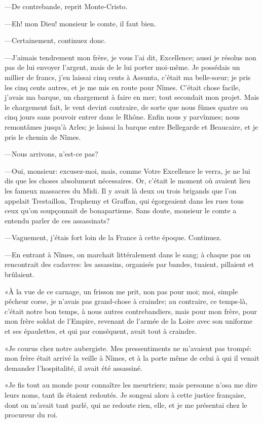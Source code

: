 —De contrebande, reprit Monte-Cristo. 

—Eh! mon Dieu! monsieur le comte, il faut bien. 

—Certainement, continuez donc.  

—J'aimais tendrement mon frère, je vous l'ai dit, Excellence; aussi je résolus non pas de lui envoyer l'argent, mais de le lui porter moi-même. Je possédais un millier de francs, j'en laissai cinq cents à Assunta, c'était ma belle-sœur; je pris les cinq cents autres, et je me mis en route pour Nîmes. C'était chose facile, j'avais ma barque, un chargement à faire en mer; tout secondait mon projet. Mais le chargement fait, le vent devint contraire, de sorte que nous fûmes quatre ou cinq jours sans pouvoir entrer dans le Rhône. Enfin nous y parvînmes; nous remontâmes jusqu'à Arles; je laissai la barque entre Bellegarde et Beaucaire, et je pris le chemin de Nîmes. 

—Nous arrivons, n'est-ce pas?  

—Oui, monsieur: excusez-moi, mais, comme Votre Excellence le verra, je ne lui dis que les choses absolument nécessaires. Or, c'était le moment où avaient lieu les fameux massacres du Midi. Il y avait là deux ou trois brigands que l'on appelait Trestaillon, Truphemy et Graffan, qui égorgeaient dans les rues tous ceux qu'on soupçonnait de bonapartisme. Sans doute, monsieur le comte a entendu parler de ces assassinats? 

—Vaguement, j'étais fort loin de la France à cette époque. Continuez. 

—En entrant à Nîmes, on marchait littéralement dans le sang; à chaque pas on rencontrait des cadavres: les assassins, organisés par bandes, tuaient, pillaient et brûlaient.  

«À la vue de ce carnage, un frisson me prit, non pas pour moi; moi, simple pêcheur corse, je n'avais pas grand-chose à craindre; au contraire, ce temps-là, c'était notre bon temps, à nous autres contrebandiers, mais pour mon frère, pour mon frère soldat de l'Empire, revenant de l'armée de la Loire avec son uniforme et ses épaulettes, et qui par conséquent, avait tout à craindre. 

«Je courus chez notre aubergiste. Mes pressentiments ne m'avaient pas trompé: mon frère était arrivé la veille à Nîmes, et à la porte même de celui à qui il venait demander l'hospitalité, il avait été assassiné. 

«Je fis tout au monde pour connaître les meurtriers; mais personne n'osa me dire leurs noms, tant ils étaient redoutés. Je songeai alors à cette justice française, dont on m'avait tant parlé, qui ne redoute rien, elle, et je me présentai chez le procureur du roi. 

